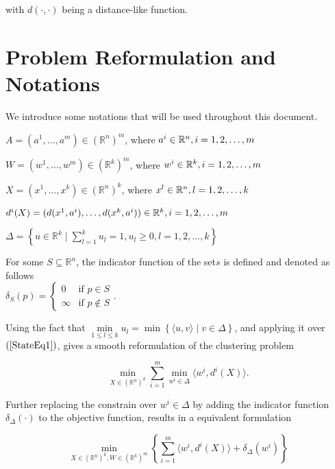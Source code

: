 \documentclass[11pt]{article}
\numberwithin{equation}{section}
\begin{document}
\noindent with $\textit{d}(\cdot ,\cdot)$ being a distance-like function.

\section{Problem Reformulation and Notations}

We introduce some notations that will be used throughout this document.

\noindent $A = (a^1, \ldots , a^m) \in \left(\mathbb{R}^n\right)^m$, where $a^i \in \mathbb{R}^n,\smallskip i=1, 2, \ldots , m$

\noindent $W = (w^1, \ldots , w^m) \in \left(\mathbb{R}^k\right)^m$, where $w^i \in \mathbb{R}^k,\smallskip i=1, 2, \ldots , m$

\noindent $X = (x^1, \ldots , x^k) \in \left(\mathbb{R}^n\right)^k$, where $x^l \in \mathbb{R}^n,\smallskip l=1, 2, \ldots , k$

\noindent $d^{i}(X) = (d(x^1,a^i), \ldots , d(x^k,a^i)) \in \mathbb{R}^k,\smallskip i=1, 2, \ldots , m$

\noindent $\Delta = \left\lbrace u \in \mathbb{R}^k \mid \sum\limits_{l=1}^{k} u_l = 1, u_l \geq 0 , l=1, 2, \ldots ,k \right\rbrace$

\noindent For some $S \subseteq \mathbb{R}^n$, the indicator function of the set$s$ is defined and denoted as follows \\ $\delta_S(p) = \begin{cases} 0 &\mbox{if } p \in S \\ 
\infty &\mbox{if } p \not\in S \end{cases}.$

Using the fact that $\min\limits_{1 \leq l \leq k} u_l = \min \left\lbrace \langle u,v \rangle \mid v \in \Delta \right\rbrace$, and applying it over $\left(\ref{StateEq1}\right)$, gives a smooth reformulation of the clustering problem

\begin{equation}
	\min\limits_{X \in \left(\mathbb{R}^n\right)^k} \sum\limits_{i=1}^{m} \min\limits_{w^i \in \Delta} \langle w^i , d^i(X) \rangle. \label{StateEq2}
\end{equation}

Further replacing the constrain over $w^i \in \Delta$ by adding the indicator function $\delta_{\Delta}(\cdot)$ to the objective function, results in a equivalent formulation

\begin{equation}
	\min\limits_{X \in \left(\mathbb{R}^n\right)^k , W \in \left(\mathbb{R}^k\right)^m} \left\lbrace \sum\limits_{i=1}^{m} \langle w^i , d^i(X) \rangle + \delta_{\Delta}(w^i) \right\rbrace \label{StateEq3}
\end{equation}
\end{document}
